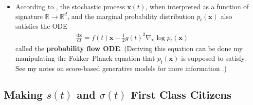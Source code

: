 \documentclass[10pt]{article}
\newcommand{\dee}{\mathrm{d}}
\newcommand{\ve}[1]{\mathbf{#1}}
\newcommand{\Real}{\mathbb{R}}
\begin{document}
\begin{itemize}
  \item According to \cite{Song:2021}, the stochastic process $\ve{x}(t)$, when interpreted as a function of signature $\Real \rightarrow \Real^d$, and the marginal probability distribution $p_t(\ve{x})$ also satisfies the ODE
  \begin{align*}
    \frac{\dee \ve{x}}{\dee t} = f(t)\ve{x} - \frac{1}{2}g(t)^2 \nabla_{\ve{x}} \log p_t(\ve{x})
  \end{align*}
  called the {\bf probability flow ODE}. (Deriving this equation can be done my manipulating the Fokker--Planck equation that $p_t(\ve{x})$ is supposed to satisfy. See my notes on score-based generative models for more information \cite{KhungurnScoreBased}.)
\end{itemize}

\subsection{Making $s(t)$ and $\sigma(t)$ First Class Citizens}
\end{document}
